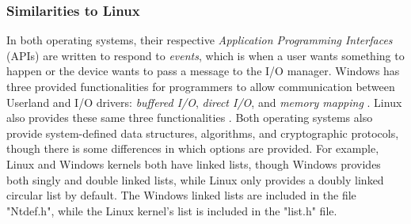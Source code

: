\documentclass[letterpaper,10pt,titlepage]{article}
\begin{document}
\subsubsection{Similarities to Linux}
In both operating systems, their respective \emph{Application Programming Interfaces} (APIs) are written to respond to \emph{events}, which is when a user wants something to happen or the device wants to pass a message to the I/O manager. Windows has three provided functionalities for programmers to allow communication between Userland and I/O drivers: \emph{buffered I/O}, \emph{direct I/O}, and \emph{memory mapping} \cite{windowsSys}. Linux also provides these same three functionalities \cite{linux}. Both operating systems also provide system-defined data structures, algorithms, and cryptographic protocols, though there is some differences in which options are provided. For example, Linux and Windows kernels both have linked lists, though Windows provides both singly and double linked lists, while Linux only provides a doubly linked circular list by default. The Windows linked lists are included in the file "Ntdef.h", while the Linux kernel's list is included in the "list.h" file.  
\end{document}

